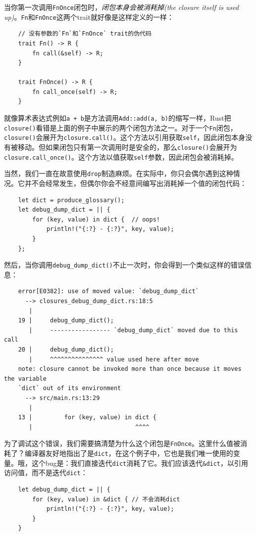 当你第一次调用\texttt{FnOnce}闭包时，\emph{闭包本身会被消耗掉(the closure itself is used up)}。\texttt{Fn}和\texttt{FnOnce}这两个trait就好像是这样定义的一样：
\begin{verbatim}
    // 没有参数的`Fn`和`FnOnce` trait的伪代码
    trait Fn() -> R {
        fn call(&self) -> R;
    }

    trait FnOnce() -> R {
        fn call_once(self) -> R;
    }
\end{verbatim}

就像算术表达式例如\texttt{a + b}是方法调用\texttt{Add::add(a, b)}的缩写一样，Rust把\texttt{closure()}看错是上面的例子中展示的两个闭包方法之一。对于一个\texttt{Fn}闭包，\texttt{closure()}会展开为\texttt{closure.call()}。这个方法以引用获取\texttt{self}，因此闭包本身没有被移动。但如果闭包只有第一次调用时是安全的，那么\texttt{closure()}会展开为\texttt{closure.call\_once()}。这个方法以值获取\texttt{self}参数，因此闭包会被消耗掉。

当然，我们一直在故意使用\texttt{drop}制造麻烦。在实际中，你只会偶尔遇到这种情况。它并不会经常发生，但偶尔你会不经意间编写出消耗掉一个值的闭包代码：
\begin{verbatim}
    let dict = produce_glossary();
    let debug_dump_dict = || {
        for (key, value) in dict {  // oops!
            println!("{:?} - {:?}", key, value);
        }
    };
\end{verbatim}

然后，当你调用\texttt{debug\_dump\_dict()}不止一次时，你会得到一个类似这样的错误信息：
\begin{verbatim}
    error[E0382]: use of moved value: `debug_dump_dict`
      --> closures_debug_dump_dict.rs:18:5
       |
    19 |     debug_dump_dict();
       |     ----------------- `debug_dump_dict` moved due to this call
    20 |     debug_dump_dict();
       |     ^^^^^^^^^^^^^^^ value used here after move
    note: closure cannot be invoked more than once because it moves the variable
    `dict` out of its environment
      --> src/main.rs:13:29
       |
    13 |         for (key, value) in dict {
       |                             ^^^^
\end{verbatim}

为了调试这个错误，我们需要搞清楚为什么这个闭包是\texttt{FnOnce}。这里什么值被消耗了？编译器友好地指出了是\texttt{dict}，在这个例子中，它也是我们唯一使用的变量。哦，这个bug是：我们直接迭代\texttt{dict}消耗了它。我们应该迭代\texttt{\&dict}，以引用访问值，而不是迭代\texttt{dict}：
\begin{verbatim}
    let debug_dump_dict = || {
        for (key, value) in &dict { // 不会消耗dict
            println!("{:?} - {:?}", key, value);
        }
    }
\end{verbatim}

